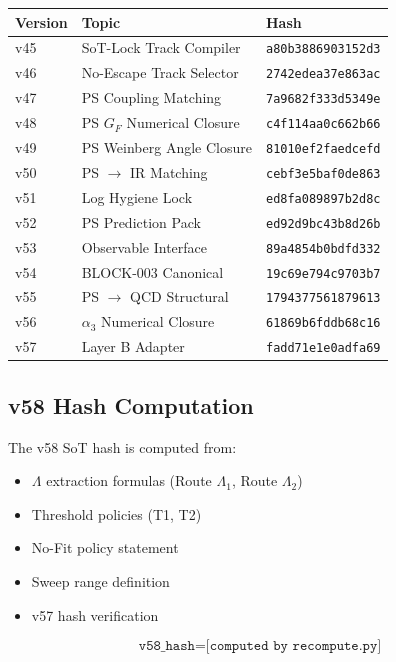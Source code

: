 \documentclass[11pt,a4paper]{article}
\theoremstyle{definition}
\begin{document}
\begin{hashbox}
\begin{tabular}{lll}
\toprule
Version & Topic & Hash \\
\midrule
v45 & SoT-Lock Track Compiler & \texttt{a80b3886903152d3} \\
v46 & No-Escape Track Selector & \texttt{2742edea37e863ac} \\
v47 & PS Coupling Matching & \texttt{7a9682f333d5349e} \\
v48 & PS $G_F$ Numerical Closure & \texttt{c4f114aa0c662b66} \\
v49 & PS Weinberg Angle Closure & \texttt{81010ef2faedcefd} \\
v50 & PS $\to$ IR Matching & \texttt{cebf3e5baf0de863} \\
v51 & Log Hygiene Lock & \texttt{ed8fa089897b2d8c} \\
v52 & PS Prediction Pack & \texttt{ed92d9bc43b8d26b} \\
v53 & Observable Interface & \texttt{89a4854b0bdfd332} \\
v54 & BLOCK-003 Canonical & \texttt{19c69e794c9703b7} \\
v55 & PS $\to$ QCD Structural & \texttt{1794377561879613} \\
v56 & $\alpha_3$ Numerical Closure & \texttt{61869b6fddb68c16} \\
v57 & Layer B Adapter & \texttt{fadd71e1e0adfa69} \\
\bottomrule
\end{tabular}
\end{hashbox}

\subsection{v58 Hash Computation}
\label{subsec:v58-hash}

The v58 SoT hash is computed from:
\begin{itemize}
  \item $\Lambda$ extraction formulas (Route $\Lambda_1$, Route $\Lambda_2$)
  \item Threshold policies (T1, T2)
  \item No-Fit policy statement
  \item Sweep range definition
  \item v57 hash verification
\end{itemize}

\begin{hashbox}
\begin{equation}
\label{eq:v58-hash}
\texttt{v58\_hash} = \texttt{[computed by recompute.py]}
\end{equation}
\end{hashbox}
\end{document}
